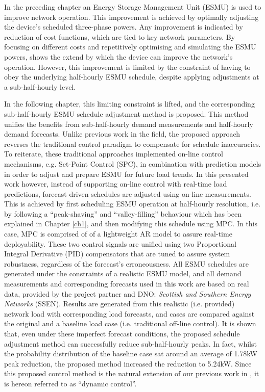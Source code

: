 

In the preceding chapter an Energy Storage Management Unit (ESMU) is used to improve network operation.
This improvement is achieved by optimally adjusting the device's scheduled three-phase powers.
Any improvement is indicated by reduction of cost functions, which are tied to key network parameters.
By focusing on different costs and repetitively optimising and simulating the ESMU powers, shows the extend by which the device can improve the network's operation.
However, this improvement is limited by the constraint of having to obey the underlying half-hourly ESMU schedule, despite applying adjustments at a sub-half-hourly level.

In the following chapter, this limiting constraint is lifted, and the corresponding sub-half-hourly ESMU schedule adjustment method is proposed.
This method unifies the benefits from sub-half-hourly demand measurements and half-hourly demand forecasts.
Unlike previous work in the field, the proposed approach reverses the traditional control paradigm to compensate for schedule inaccuracies.
To reiterate, these traditional approaches implemented on-line control mechanisms, e.g. Set-Point Control (SPC), in combination with prediction models in order to adjust and prepare ESMU for future load trends.
In this presented work however, instead of supporting on-line control with real-time load predictions, forecast driven schedules are adjusted using on-line measurements.
This is achieved by first scheduling ESMU operation at half-hourly resolution, i.e. by following a ``peak-shaving'' and ``valley-filling'' behaviour which has been explained in Chapter \ref{ch1}, and then modifying this schedule using MPC.
In this case, MPC is comprised of of a lightweight AR model to assure real-time deployability.
These two control signals are unified using two Proportional Integral Derivative (PID) compensators that are tuned to assure system robustness, regardless of the forecast's erroneousness.
All ESMU schedules are generated under the constraints of a realistic ESMU model, and all demand measurements and corresponding forecasts used in this work are based on real data, provided by the project partner and DNO: \textit{Scottish and Southern Energy Networks} (SSEN).
Results are generated from this realistic (i.e. provided) network load with corresponding load forecasts, and cases are compared against the original and a baseline load case (i.e. traditional off-line control).
It is shown that, even under these imperfect forecast conditions, the proposed schedule adjustment method can successfully reduce sub-half-hourly peaks.
In fact, whilst the probability distribution of the baseline case sat around an average of 1.78kW peak reduction, the proposed method increased the reduction to 5.24kW.
Since this proposed control method is the natural extension of our previous work in \cite{Zangs2016}, it is hereon referred to as ``dynamic control''.


